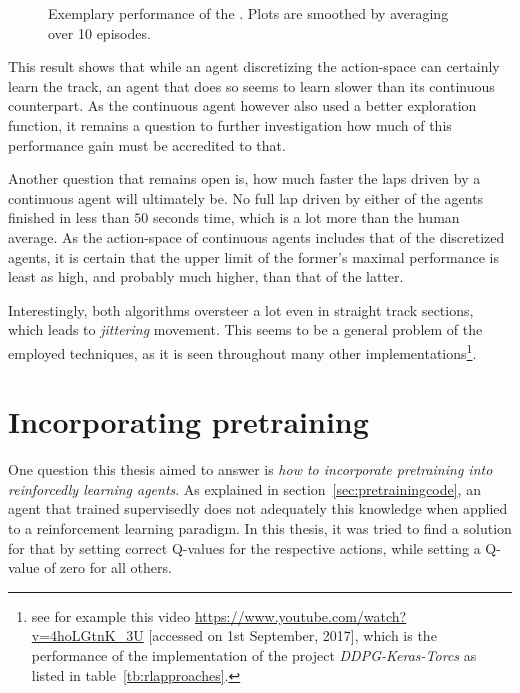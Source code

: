 \begin{figure}[h!]
	{%
		\setlength{\fboxsep}{0pt}%
		\setlength{\fboxrule}{1pt}%
	}%
	\centering
	\caption[Exemplary performance of the ]{Exemplary performance of the . Plots are smoothed by averaging over 10 episodes.}
	\label{fig:ddpg_result}
\end{figure}


This result shows that while an agent discretizing the action-space can certainly learn the track, an agent that does so seems to learn slower than its continuous counterpart. As the continuous agent however also used a better exploration function, it remains a question to further investigation how much of this performance gain must be accredited to that. 

Another question that remains open is, how much faster the laps driven by a continuous agent will ultimately be. No full lap driven by either of the agents finished in less than $50$ seconds time, which is a lot more than the human average. As the action-space of continuous agents includes that of the discretized agents, it is certain that the upper limit of the former's maximal performance is least as high, and probably much higher, than that of the latter.

Interestingly, both algorithms oversteer a lot even in straight track sections, which leads to \textit{jittering} movement. This seems to be a general problem of the employed techniques, as it is seen throughout many other implementations\footnote{see for example this video \url{https://www.youtube.com/watch?v=4hoLGtnK_3U} [accessed on 1st September, 2017], which is the performance of the implementation of the project \textit{DDPG-Keras-Torcs} as listed in table~\ref{tb:rlapproaches}.}.


\section{Incorporating pretraining}
\label{sec:incorporatePre}

One question this thesis aimed to answer is \textit{how to incorporate pretraining into reinforcedly learning agents}. As explained in section~\ref{sec:pretrainingcode}, an agent that trained supervisedly does not adequately  this knowledge when applied to a reinforcement learning paradigm. In this thesis, it was tried to find a solution for that by setting correct Q-values for the respective actions, while setting a Q-value of zero for all others.

